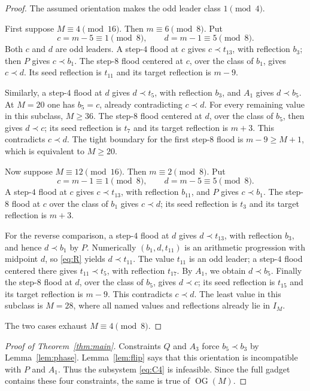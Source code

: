 \documentclass[11pt]{article}
\newcommand{\IM}{I_M}
\newcommand{\OG}{\operatorname{OG}}
\begin{document}
\begin{proof}
The assumed orientation makes the odd leader class $1\pmod4$.

First suppose $M\equiv4\pmod{16}$.  Then $m\equiv6\pmod8$.  Put
\[
  c=m-5\equiv1\pmod8,
  \qquad
  d=m-1\equiv5\pmod8.
\]
Both $c$ and $d$ are odd leaders.  A step-$4$ flood at $c$ gives
$c\prec t_{13}$, with reflection $b_3$; then $P$ gives $c\prec b_1$.
The step-$8$ flood centered at $c$, over the class of $b_1$, gives
$c\prec d$.  Its seed reflection is $t_{11}$ and its target reflection is
$m-9$.

Similarly, a step-$4$ flood at $d$ gives $d\prec t_5$, with reflection
$b_3$, and $A_1$ gives $d\prec b_5$.  At $M=20$ one has $b_5=c$, already
contradicting $c\prec d$.  For every remaining value in this subclass,
$M\geq36$.  The step-$8$ flood centered at $d$, over the class of $b_5$,
then gives $d\prec c$; its seed reflection is $t_7$ and its target reflection
is $m+3$.  This contradicts $c\prec d$.  The tight boundary for the first
step-$8$ flood is $m-9\geq M+1$, which is equivalent to $M\geq20$.

Now suppose $M\equiv12\pmod{16}$.  Then $m\equiv2\pmod8$.  Put
\[
  c=m-1\equiv1\pmod8,
  \qquad
  d=m-5\equiv5\pmod8.
\]
A step-$4$ flood at $c$ gives $c\prec t_{13}$, with reflection $b_{11}$,
and $P$ gives $c\prec b_1$.  The step-$8$ flood at $c$ over the class of
$b_1$ gives $c\prec d$; its seed reflection is $t_3$ and its target
reflection is $m+3$.

For the reverse comparison, a step-$4$ flood at $d$ gives
$d\prec t_{13}$, with reflection $b_3$, and hence $d\prec b_1$ by $P$.
Numerically $(b_1,d,t_{11})$ is an arithmetic progression with midpoint $d$,
so \eqref{eq:R} yields $d\prec t_{11}$.  The value $t_{11}$ is an odd leader;
a step-$4$ flood centered there gives $t_{11}\prec t_5$, with reflection
$t_{17}$.  By $A_1$, we obtain $d\prec b_5$.  Finally the step-$8$ flood at
$d$, over the class of $b_5$, gives $d\prec c$; its seed reflection is
$t_{15}$ and its target reflection is $m-9$.  This contradicts $c\prec d$.
The least value in this subclass is $M=28$, where all named values and
reflections already lie in $\IM$.

The two cases exhaust $M\equiv4\pmod8$.
\end{proof}

\begin{proof}[Proof of Theorem~\ref{thm:main}]
Constraints $Q$ and $A_3$ force $b_5\prec b_3$ by Lemma~\ref{lem:phase}.
Lemma~\ref{lem:flip} says that this orientation is incompatible with $P$ and
$A_1$.  Thus the subsystem \eqref{eq:C4} is infeasible.  Since the full
gadget contains these four constraints, the same is true of $\OG(M)$.
\end{proof}
\end{document}
